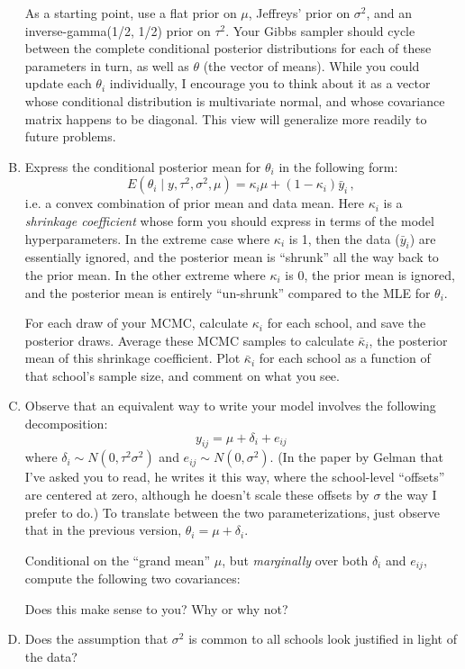 \documentclass[11pt]{article}
\begin{document}
\begin{enumerate}[(A)]
As a starting point, use a flat prior on $\mu$, Jeffreys' prior on $\sigma^2$, and an inverse-gamma(1/2, 1/2) prior on $\tau^2$.  Your Gibbs sampler should cycle between the complete conditional posterior distributions for each of these parameters in turn, as well as $\theta$ (the vector of means).  While you could update each $\theta_i$ individually, I encourage you to think about it as a vector whose conditional distribution is multivariate normal, and whose covariance matrix happens to be diagonal.  This view will generalize more readily to future problems.  

\item Express the conditional posterior mean for $\theta_i$ in the following form:
$$
E(\theta_i \mid y, \tau^2, \sigma^2, \mu) = \kappa_i \mu + (1-\kappa_i) \bar{y}_i \, ,
$$
i.e. a convex combination of prior mean and data mean.  Here $\kappa_i$ is a \textit{shrinkage coefficient} whose form you should express in terms of the model hyperparameters.  In the extreme case where $\kappa_i$ is 1, then the data ($\bar{y}_i$) are essentially ignored, and the posterior mean is ``shrunk'' all the way back to the prior mean.  In the other extreme where $\kappa_i$ is 0, the prior mean is ignored, and the posterior mean is entirely ``un-shrunk'' compared to the MLE for $\theta_i$.  

For each draw of your MCMC, calculate $\kappa_i$ for each school, and save the posterior draws.  Average these MCMC samples to calculate $\bar{\kappa}_i$, the posterior mean of this shrinkage coefficient.   Plot $\bar{\kappa}_i$ for each school as a function of that school's sample size, and comment on what you see.  

\item Observe that an equivalent way to write your model involves the following decomposition:  
$$
y_{ij} = \mu + \delta_i + e_{ij}
$$
where $\delta_i \sim N(0, \tau^2 \sigma^2)$ and $e_{ij} \sim N(0, \sigma^2)$.  (In the paper by Gelman that I've asked you to read, he writes it this way, where the school-level ``offsets'' are centered at zero, although he doesn't scale these offsets by $\sigma$ the way I prefer to do.)  To translate between the two parameterizations, just observe that in the previous version, $\theta_i = \mu + \delta_i$.  

Conditional on the ``grand mean'' $\mu$, but \emph{marginally} over both $\delta_i$ and $e_{ij}$, compute the following two covariances:


Does this make sense to you?  Why or why not?  

\item Does the assumption that $\sigma^2$ is common to all schools look justified in light of the data?  

\end{enumerate}
\end{document}
